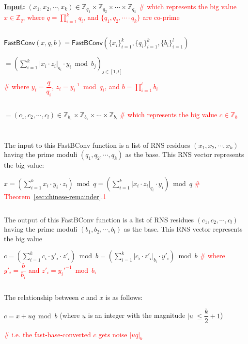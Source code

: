 \begin{tcolorbox}[title={\textbf{\tboxlabel{\ref*{subsec:rns-fastbconv}} Fast Base Conversion: \textsf{FastBConv}}}]


\textbf{\underline{Input}:} $(x_1, x_2, \cdots, x_k) \in \mathbb{Z}_{q_1} \times \mathbb{Z}_{q_2} \times \cdots \times \mathbb{Z}_{q_k}$ \textcolor{red}{ \# which represents the big value $x \in \mathbb{Z}_q$, where $q = \prod\limits_{i=1}^kq_i$, and $\{q_1, q_2, \cdots \cdot q_k\}$ are co-prime}

$ $

$\textsf{FastBConv}(x, q, b)= \textsf{FastBConv}(\{x_i\}_{i=1}^{k}, \{q_i\}_{i=1}^{k}, \{b_i\}_{i=1}^{l})$

$ = \left( \sum\limits_{i=1}^{k} |x_i \cdot z_i|_{q_i} \cdot y_i \bmod b_j \right)_{j \in [1,l]}$  

\textcolor{red}{ \# where $y_i = \dfrac{q}{q_i} \text{, } z_i = y_{i}^{-1} \bmod{q_i}$, and $b = \prod\limits_{i=1}^{l}b_{i}$} 

$ $

$ = (c_1, c_2, \cdots, c_l) \in \mathbb{Z}_{b_1} \times \mathbb{Z}_{b_2} \times \cdots \times \mathbb{Z}_{b_l}$ \textcolor{red}{ \# which represents the big value $c \in \mathbb{Z}_b$}

$ $

$ $

The input to this \textsf{FastBConv} function is a list of RNS residues $(x_1, x_2, \cdots, x_k)$ having the prime moduli $(q_1, q_2, \cdots, q_k)$ as the base. This RNS vector represents the big value:

$x = \left(\sum\limits_{i=1}^k x_i\cdot y_i \cdot z_i\right) \bmod q = \left(\sum\limits_{i=1}^k |x_i\cdot z_i|_{q_i} \cdot y_i\right) \bmod q$ \textcolor{red}{ \# Theorem~\ref*{sec:chinese-remainder}.1}

$ $

The output of this \textsf{FastBConv} function is a list of RNS residues $(c_1, c_2, \cdots, c_l)$ having the prime moduli $(b_1, b_2, \cdots, b_l)$ as the base. This RNS vector represents the big value 

$c = \left(\sum\limits_{i=1}^k c_i\cdot y'_i \cdot z'_i\right) \bmod b = \left(\sum\limits_{i=1}^k |c_i\cdot z'_i|_{b_i} \cdot y'_i\right) \bmod b$ \textcolor{red}{ \# where $y'_i = \dfrac{b}{b_i}$ and $z'_i = y_{i}'^{-1} \bmod {b_i}$}

$ $

The relationship between $c$ and $x$ is as follows: 

$c = x + uq \bmod b$ (where $u$ is an integer with the magnitude $|u| \leq \dfrac{k}{2} + 1$) 

\textcolor{red}{ \# i.e. the fast-base-converted $c$ gets noise $|uq|_b$}


\end{tcolorbox}


